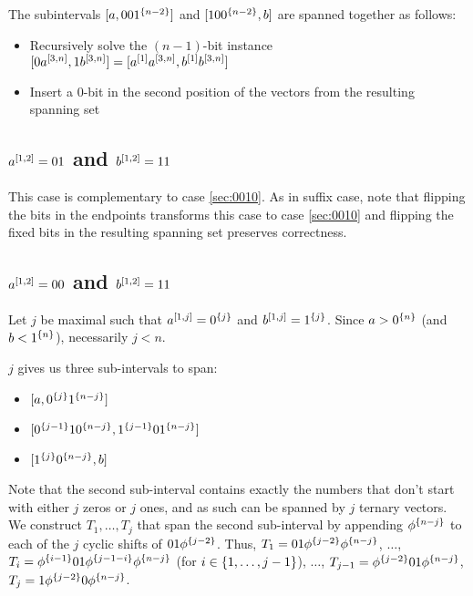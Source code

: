 The subintervals
$[a, 00 1^{\{n-2\}}]$
and
$[10 0^{\{n-2\}}, b]$
are spanned together as follows:

\begin{itemize}
\item Recursively solve the $(n-1)$-bit instance
$[0 a^{[3, n]}, 1 b^{[3, n]}]
= [a^{[1]} a^{[3, n]}, b^{[1]} b^{[3, n]}]$
\item Insert a $0$-bit in the second position
of the vectors from the resulting spanning set
\end{itemize}

\subsection{\texorpdfstring
{$a^{[1, 2]} = 01$ and $b^{[1, 2]} = 11$}
{a[1,2] = 01 and b[1,2] = 11}
}

This case is complementary to case \ref{sec:0010}.
As in suffix case,
note that flipping the bits in the endpoints
transforms this case to case \ref{sec:0010}
and flipping the fixed bits in the resulting spanning set
preserves correctness.

\subsection{\texorpdfstring
{$a^{[1, 2]} = 00$ and $b^{[1, 2]} = 11$}
{a[1,2] = 00 and b[1,2] = 11}
}

Let $j$ be maximal such that
$a^{[1, j]} = 0^{\{j\}}$ and
$b^{[1, j]} = 1^{\{j\}}$.
Since $a > 0^{\{n\}}$ (and $b < 1^{\{n\}}$),
necessarily $j < n$.

$j$ gives us three sub-intervals to span:

\begin{itemize}
\item $[a, 0^{\{j\}} 1^{\{n-j\}}]$
\item $[0^{\{j-1\}} 1 0^{\{n-j\}}, 1^{\{j-1\}} 0 1^{\{n-j\}}]$
\item $[1^{\{j\}} 0^{\{n-j\}}, b]$
\end{itemize}

Note that the second sub-interval contains exactly
the numbers that don't start with either $j$ zeros
or $j$ ones,
and as such can be spanned by $j$ ternary vectors.
We construct $T_1, \ldots, T_j$ that span
the second sub-interval
by appending $\phi^{\{n-j\}}$
to each of the $j$ cyclic shifts of $01 \phi^{\{j-2\}}$.
Thus,
$T_1 = 01 \phi^{\{j-2\}} \phi^{\{n-j\}}$,
$\ldots$,
$T_i = \phi^{\{i-1\}} 01 \phi^{\{j-1-i\}} \phi^{\{n-j\}}$
(for $i \in \{1, \ldots, j-1\}$),
$\ldots$,
$T_{j-1} = \phi^{\{j-2\}} 01 \phi^{\{n-j\}}$,
$T_j = 1 \phi^{\{j-2\}} 0 \phi^{\{n-j\}}$.

